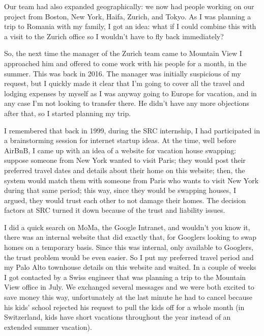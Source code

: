 \documentclass[12pt]{book}
\begin{document}
Our team had also expanded geographically: we now had people working on
our project from Boston, New York, Haifa, Zurich, and Tokyo. As I was
planning a trip to Romania with my family, I got an idea: what if I
could combine this with a visit to the Zurich office so I wouldn't have
to fly back immediately?

So, the next time the manager of the Zurich team came to Mountain View I
approached him and offered to come work with his people for a month, in
the summer. This was back in 2016. The manager was initially suspicious
of my request, but I quickly made it clear that I'm going to cover all
the travel and lodging expenses by myself as I was anyway going to
Europe for vacation, and in any case I'm not looking to transfer there.
He didn't have any more objections after that, so I started planning my
trip.

I remembered that back in 1999, during the SRC internship, I had
participated in a brainstorming session for internet startup ideas. At
the time, well before AirBnB, I came up with an idea of a website for
vacation house swapping: suppose someone from New York wanted to visit
Paris; they would post their preferred travel dates and details about
their home on this website; then, the system would match them with
someone from Paris who wants to visit New York during that same period;
this way, since they would be swapping houses, I argued, they would
trust each other to not damage their homes. The decision factors at SRC
turned it down because of the trust and liability issues.

I did a quick search on MoMa, the Google Intranet, and wouldn't you know
it, there was an internal website that did exactly that, for Googlers
looking to swap homes on a temporary basis. Since this was internal,
only available to Googlers, the trust problem would be even easier. So I
put my preferred travel period and my Palo Alto townhouse details on
this website and waited. In a couple of weeks I got contacted by a Swiss
engineer that was planning a trip to the Mountain View office in July.
We exchanged several messages and we were both excited to save money
this way, unfortunately at the last minute he had to cancel because his
kids' school rejected his request to pull the kids off for a whole month
(in Switzerland, kids have short vacations throughout the year instead
of an extended summer vacation).
\end{document}
